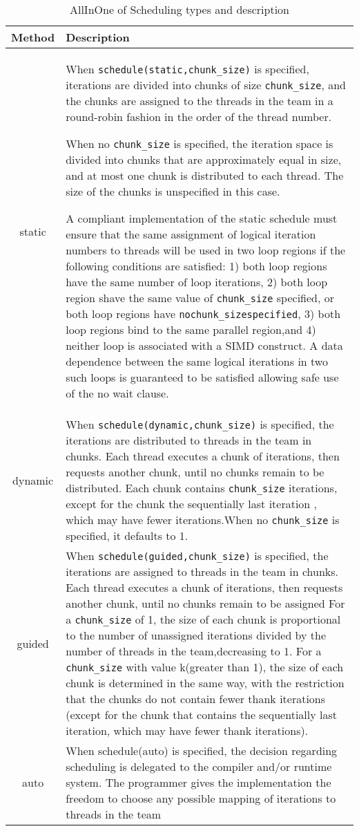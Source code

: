 \documentclass[paper=letter, fontsize=12pt]{article}
\begin{document}
\begin{table}[H]
    \centering
    \begin{tabular}{c | p{15cm}}
        \textbf{Method} & \textbf{Description}
        \\ \hline \hline
        static & When \verb|schedule(static,chunk_size)| is specified, iterations are divided into chunks of size \verb|chunk_size|, and the chunks are assigned to the threads in the team in a round-robin fashion in the order of the thread number.
        
        When no \verb|chunk_size| is specified, the iteration space is divided into chunks that are approximately equal in size, and at most one chunk is distributed to each thread. The size of the chunks is unspecified in this case.
        
        A compliant implementation of the static schedule must ensure that the same assignment of logical iteration numbers to threads will be used in two loop regions if the following conditions are satisfied: 1) both loop regions have the same number of loop iterations, 2) both loop region shave the same value of \verb|chunk_size| specified, or both loop regions have \verb|nochunk_sizespecified|, 3) both loop regions bind to the same parallel region,and 4) neither loop is associated with a SIMD construct. A data dependence between the same logical iterations in two such loops is guaranteed to be satisfied allowing safe use of the no wait clause.
        \\ \hline
        dynamic & When \verb|schedule(dynamic,chunk_size)| is specified, the iterations are distributed to threads in the team in chunks. Each thread executes a chunk of iterations, then requests another chunk, until no chunks remain to be distributed.
        Each chunk contains \verb|chunk_size| iterations, except for the chunk the sequentially last iteration
        , which may have fewer iterations.When no \verb|chunk_size| is specified, it defaults to 1.
        \\ \hline
        guided & When \verb|schedule(guided,chunk_size)| is specified, the iterations are assigned to threads in the team in chunks. Each thread executes a chunk of iterations, then requests another chunk, until no chunks remain to be assigned
        For a \verb|chunk_size| of 1, the size of each chunk is proportional to the number of unassigned iterations divided by the number of threads in the team,decreasing to 1. For a \verb|chunk_size| with value k(greater than 1), the size of each chunk is determined in the same way, with the restriction that the chunks do not contain fewer thank iterations (except for the chunk that contains the sequentially last iteration, which may have fewer thank iterations).
        \\ \hline
        auto & When schedule(auto) is specified, the decision regarding scheduling is delegated to the compiler and/or runtime system. The programmer gives the implementation the freedom to choose any possible mapping of iterations to threads in the team
    \end{tabular}
    \caption{AllInOne of Scheduling types and description}
\end{table}
\end{document}
